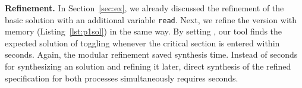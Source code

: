 \textbf{Refinement.}
In Section~\ref{sec:ex}, we already discussed the refinement of the basic \ags 
solution with an additional variable \texttt{read}. Next, we refine the version 
with memory (Listing~\ref{lst:p1sol}) in the same way. By setting 
\mrk{\ctrl}, our tool finds the expected 
solution  of toggling 
 whenever the critical section is entered within  seconds. Again, the modular refinement saved synthesis time.  Instead of  
seconds for synthesizing an \ags solution and refining it later, direct 
synthesis of the refined specification for both processes simultaneously 
requires  seconds.





